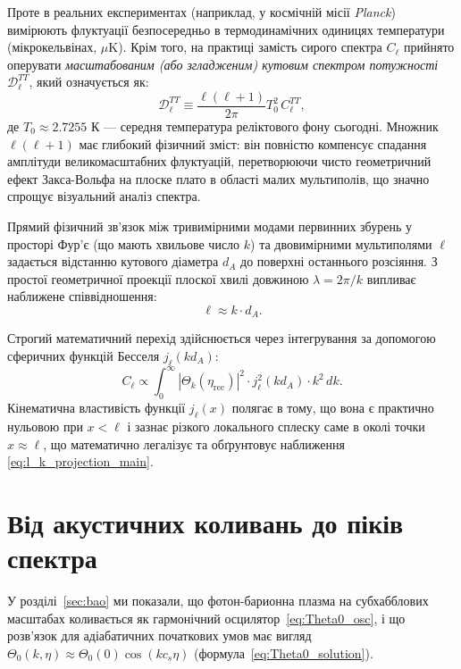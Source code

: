 Проте в реальних експериментах (наприклад, у космічній місії \emph{Planck}) вимірюють флуктуації безпосередньо в термодинамічних одиницях температури (мікрокельвінах, $\mu\text{K}$). Крім того, на практиці замість сирого спектра $C_\ell$ прийнято оперувати \emph{масштабованим (або згладженим) кутовим спектром потужності} $\mathcal{D}_\ell^{TT}$, який означується як:
\begin{equation}\label{eq:Dl_definition}
    \mathcal{D}_\ell^{TT} \equiv \frac{\ell(\ell+1)}{2\pi} T_0^2 \, C_\ell^{TT},
\end{equation}
де $T_0 \approx 2.7255\text{ К}$ --- середня температура реліктового фону сьогодні. Множник $\ell(\ell+1)$ має глибокий фізичний зміст: він повністю компенсує спадання амплітуди великомасштабних флуктуацій, перетворюючи чисто геометричний ефект Закса-Вольфа на плоске плато в області малих мультиполів, що значно спрощує візуальний аналіз спектра.

Прямий фізичний зв'язок між тривимірними модами первинних збурень у просторі Фур'є (що мають хвильове число $k$) та двовимірними мультиполями $\ell$ задається відстанню кутового діаметра $d_A$ до поверхні останнього розсіяння. З простої геометричної проекції плоскої хвилі довжиною $\lambda = 2\pi/k$ випливає наближене співвідношення:
\begin{equation}\label{eq:l_k_projection_main}
    \ell \approx k\cdot d_A.
\end{equation}

Строгий математичний перехід здійснюється через інтегрування за допомогою сферичних функцій Бесселя $j_\ell(kd_A)$:
\begin{equation}\label{eq:bessel_integral_main}
    C_\ell \propto \int_0^{\infty}|\Theta_k(\eta_\text{rec})|^2\cdot j_\ell^2(kd_A)\cdot k^2\,dk.
\end{equation}
Кінематична властивість функції $j_\ell(x)$ полягає в тому, що вона є практично нульовою при $x < \ell$ і зазнає різкого локального сплеску саме в околі точки $x \approx \ell$, що математично легалізує та обґрунтовує наближення \eqref{eq:l_k_projection_main}.

\section{Від акустичних коливань до піків спектра}
\label{subsec:acoustic_oscillations}

У розділі~\ref{sec:bao} ми показали, що фотон-барионна
плазма на субхабблових масштабах коливається як
гармонічний осцилятор~\eqref{eq:Theta0_osc}, і що
розв'язок для адіабатичних початкових умов має вигляд
$\Theta_0(k,\eta) \approx \Theta_0(0)\cos(kc_s\eta)$
(формула~\eqref{eq:Theta0_solution}).

